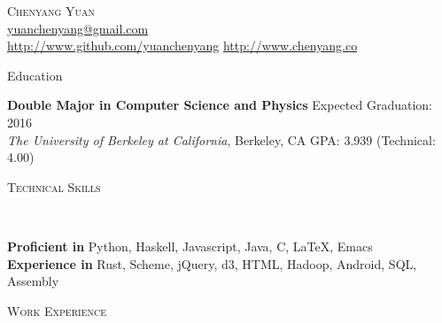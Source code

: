\documentclass[9pt]{article}
\newenvironment{changemargin}[2]{%
  \begin{list}{}{%
      \setlength{\topsep}{0pt}%
      \setlength{\leftmargin}{#1}%
      \setlength{\rightmargin}{#2}%
      \setlength{\listparindent}{\parindent}%
      \setlength{\itemindent}{\parindent}%
      \setlength{\parsep}{\parskip}%
    }%
  \item[]}{\end{list}
}
\newcommand{\lineover}{
  \begin{changemargin}{-0.05in}{-0.05in}
    \vspace*{-8pt}
    \hrulefill \\
    \vspace*{-2pt}
  \end{changemargin}
}
\newcommand{\header}[1]{
  \begin{changemargin}{-0.5in}{-0.5in}
    \scshape{#1}\\
    \lineover
  \end{changemargin}
}
\newcommand{\contact}[4]{
  \begin{changemargin}{-0.5in}{-0.5in}
    \begin{center}
      {\Large \scshape {#1}}\\ \smallskip
      {#2}\\ \smallskip
      {#3}\\ \smallskip
      {#4}\smallskip
    \end{center}
  \end{changemargin}
}
\newenvironment{body} {
  \vspace*{-16pt}
  \begin{changemargin}{-0.25in}{-0.5in}
  }
  {\end{changemargin}
}
\begin{document}
\contact{Chenyang Yuan}{\href{mailto:yuanchenyang@gmail.com}{yuanchenyang@gmail.com}}{ \url{http://www.github.com/yuanchenyang} \quad \url{http://www.chenyang.co}}

\header{Education}

\begin{body}
  \vspace{14pt}
  \textbf{Double Major in Computer Science and Physics} \hfill Expected Graduation: 2016 \\
  \emph{The University of Berkeley at California}, Berkeley, CA{} \hfill GPA: 3.939 (Technical: 4.00)\\
\end{body}

\smallskip

\header{Technical Skills}

\begin{body}
  \vspace{14pt}
  \textbf{Proficient in} Python, Haskell, Javascript, Java,  C, \LaTeX, Emacs \\
  \textbf{Experience in} Rust, Scheme, jQuery, d3, HTML, Hadoop, Android, SQL, Assembly
\end{body}

\smallskip



\header{Work Experience}
\end{document}
